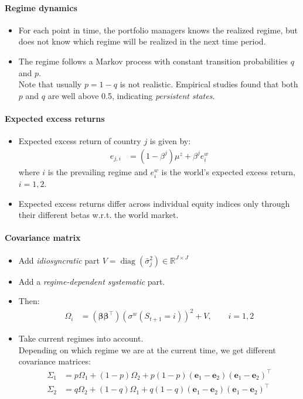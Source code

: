 \documentclass[a4paper,landscape,8pt,fleqn]{scrartcl}
\DeclareMathOperator{\diag}{diag}				%
\begin{document}
\begin{multicols*}{3}
\paragraph{Regime dynamics}
\begin{itemize}
\item For each point in time, the portfolio managers knows the realized regime, but does not know which regime will be realized in the next time period.
\item The regime follows a Markov process with constant transition probabilities $q$ and $p$. \\
Note that usually $p = 1-q$ is not realistic. Empirical studies found that both $p$ and $q$ are well above 0.5, indicating \textit{persistent states}.
\end{itemize}

\paragraph{Expected excess returns}
\begin{itemize}
\item Expected excess return of country $j$ is given by:
\begin{align*}
e_{j,i} &= (1-\beta^j) \mu^z + \beta^j e_i^w
\end{align*}
where $i$ is the prevailing regime and $e_i^w$ is the world's expected excess return, $i=1,2$.
\item Expected excess returns differ across individual equity indices only through their different betas w.r.t. the world market.
\end{itemize}

\paragraph{Covariance matrix}
\begin{itemize}
\item Add \textit{idiosyncratic} part $V = \diag(\bar \sigma_j^2) \in \mathbb{R}^{J \times J}$
\item Add a \textit{regime-dependent systematic} part.
\item Then:
\begin{align*}
\Omega_i &= (\bm \beta \bm \beta^\top) (\sigma^w(S_{t+1} = i))^2 + V, \qquad i = 1,2
\end{align*}
\item Take current regimes into account. \\
Depending on which regime we are at the current time, we get different covariance matrices:
\begin{align*}
\Sigma_1 &= p \Omega_1 + (1-p) \Omega_2 + p(1-p)(\bm e_1 - \bm e_2) (\bm e_1 - \bm e_2)^\top \\
\Sigma_2 &= q \Omega_2 + (1-q) \Omega_1 + q(1-q)(\bm e_1 - \bm e_2) (\bm e_1 - \bm e_2)^\top
\end{align*}
\end{itemize}


\end{multicols*}
\end{document}
